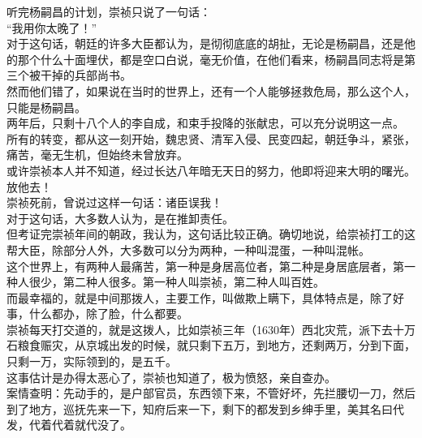 \begin{multicols}{\theparacolNo}
听完杨嗣昌的计划，崇祯只说了一句话：\\

“我用你太晚了！”\\

对于这句话，朝廷的许多大臣都认为，是彻彻底底的胡扯，无论是杨嗣昌，还是他的那个什么十面埋伏，都是空口白说，毫无价值，在他们看来，杨嗣昌同志将是第三个被干掉的兵部尚书。\\

然而他们错了，如果说在当时的世界上，还有一个人能够拯救危局，那么这个人，只能是杨嗣昌。\\

两年后，只剩十八个人的李自成，和束手投降的张献忠，可以充分说明这一点。\\

所有的转变，都从这一刻开始，魏忠贤、清军入侵、民变四起，朝廷争斗，紧张，痛苦，毫无生机，但始终未曾放弃。\\

或许崇祯本人并不知道，经过长达八年暗无天日的努力，他即将迎来大明的曙光。\\

放他去！\\

崇祯死前，曾说过这样一句话：诸臣误我！\\

对于这句话，大多数人认为，是在推卸责任。\\

但考证完崇祯年间的朝政，我认为，这句话比较正确。确切地说，给崇祯打工的这帮大臣，除部分人外，大多数可以分为两种，一种叫混蛋，一种叫混帐。\\

这个世界上，有两种人最痛苦，第一种是身居高位者，第二种是身居底层者，第一种人很少，第二种人很多。第一种人叫崇祯，第二种人叫百姓。\\

而最幸福的，就是中间那拨人，主要工作，叫做欺上瞒下，具体特点是，除了好事，什么都办，除了脸，什么都要。\\

崇祯每天打交道的，就是这拨人，比如崇祯三年（1630年）西北灾荒，派下去十万石粮食赈灾，从京城出发的时候，就只剩下五万，到地方，还剩两万，分到下面，只剩一万，实际领到的，是五千。\\

这事估计是办得太恶心了，崇祯也知道了，极为愤怒，亲自查办。\\

案情查明：先动手的，是户部官员，东西领下来，不管好坏，先拦腰切一刀，然后到了地方，巡抚先来一下，知府后来一下，剩下的都发到乡绅手里，美其名曰代发，代着代着就代没了。\\


\end{multicols}
